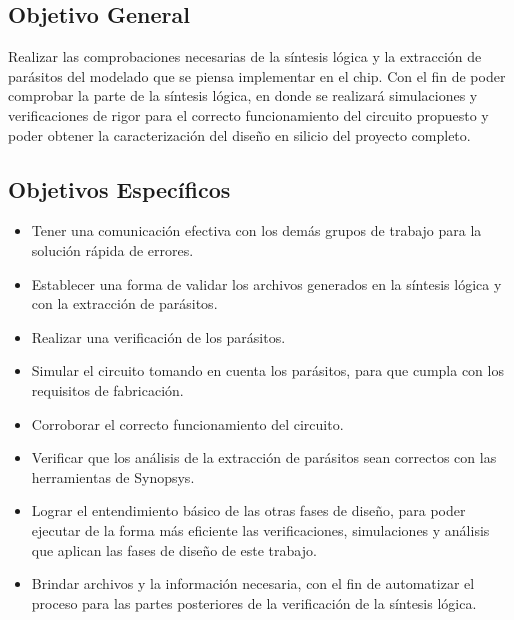 \subsection*{Objetivo General}

Realizar las comprobaciones necesarias de la síntesis lógica y la extracción de parásitos del modelado que se piensa implementar en el chip.
Con el fin de poder comprobar la parte de la síntesis lógica, en donde se realizará simulaciones y verificaciones de rigor para el correcto funcionamiento del circuito propuesto y poder obtener la caracterización del diseño en silicio del proyecto completo.








\subsection*{Objetivos Específicos}
\begin{itemize}

\item Tener una comunicación efectiva con los demás grupos de trabajo para la solución rápida de errores.

\item Establecer una forma de validar los archivos generados en la síntesis lógica y con la extracción de parásitos. 

\item Realizar una verificación de los parásitos.

\item Simular el circuito tomando en cuenta los parásitos, para que cumpla con los requisitos de fabricación. 

\item Corroborar el correcto funcionamiento del circuito.

\item Verificar que los análisis de la extracción de parásitos sean correctos con las herramientas de Synopsys. 

\item Lograr el entendimiento básico de las otras fases de diseño, para poder ejecutar de la forma más eficiente las verificaciones, simulaciones y análisis que aplican las fases de diseño de este trabajo.

\item Brindar archivos y la información necesaria, con el fin de automatizar el proceso para las partes posteriores de la verificación de la síntesis lógica.


\end{itemize}